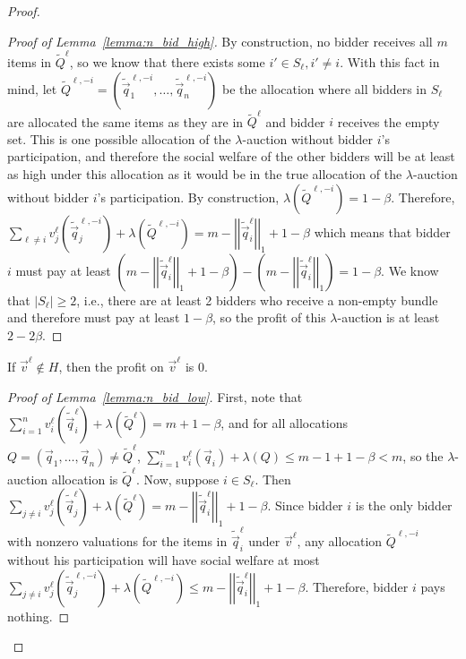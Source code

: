 \begin{proof}
\begin{proof}[Proof of Lemma~\ref{lemma:n_bid_high}]
By construction, no bidder receives all $m$ items in $\tilde{Q}^\ell$, so we know that there exists some $i' \in S_\ell, i' \not = i$. With this fact in mind, let $\tilde{Q}^{\ell,-i} = \left(\tilde{\vec{q}}^{\ell, -i}_1, \dots, \tilde{\vec{q}}^{\ell,-i}_n\right)$ be the allocation where all bidders in $S_\ell$ are allocated the same items as they are in $\tilde{Q}^\ell$ and bidder $i$ receives the empty set. This is one possible allocation of the $\lambda$-auction without bidder $i$'s participation, and therefore the social welfare of the other bidders will be at least as high under this allocation as it would be in the true allocation of the $\lambda$-auction without bidder $i$'s participation. By construction, $\lambda\left(\tilde{Q}^{\ell,-i}\right) = 1 - \beta$. Therefore, $\sum_{\ell \not= i} v_j^\ell \left(\tilde{\vec{q}}_j^{\ell,-i}\right) + \lambda\left(\tilde{Q}^{\ell,-i}\right) = m-\left|\left|\tilde{\vec{q}}_i^{\ell}\right|\right|_1 + 1 - \beta$ which means that bidder $i$ must pay at least $\left(m-\left|\left|\tilde{\vec{q}}_i^{\ell}\right|\right|_1 + 1 - \beta\right) - \left(m-\left|\left|\tilde{\vec{q}}_i^{\ell}\right|\right|_1\right) = 1 - \beta.$ We know that $|S_\ell|\geq 2$, i.e., there are at least 2 bidders who receive a non-empty bundle and therefore must pay at least $1 - \beta$, so the profit of this $\lambda$-auction is at least $2-2\beta$.
\end{proof}

\begin{lemma}\label{lemma:n_bid_low} If $\vec{v}^\ell \not\in H$, then the profit on $\vec{v}^\ell$ is 0.
\end{lemma}

\begin{proof}[Proof of Lemma~\ref{lemma:n_bid_low}]
First, note that $\sum_{i = 1}^n v_i^\ell\left(\tilde{\vec{q}}_i^{\ell}\right) + \lambda\left(\tilde{Q}^\ell\right) = m + 1-\beta$, and for all allocations $Q = \left(\vec{q}_1, \dots, \vec{q}_n\right) \not= \tilde{Q}^\ell$, $\sum_{i = 1}^n v_i^\ell\left(\vec{q}_i\right) + \lambda\left(Q\right) \leq m-1 + 1-\beta < m$, so the $\lambda$-auction allocation is $\tilde{Q}^\ell$. Now, suppose $i \in S_\ell$. Then $\sum_{j \not= i} v_j^\ell\left(\tilde{\vec{q}}_j^\ell\right) + \lambda\left(\tilde{Q}^\ell\right) = m - \left|\left|\tilde{\vec{q}}_i^{\ell}\right|\right|_1 + 1 - \beta.$ Since bidder $i$ is the only bidder with nonzero valuations for the items in $\tilde{\vec{q}}_i^{\ell}$ under $\vec{v}^\ell$, any allocation $\tilde{Q}^{\ell,-i}$ without his participation will have social welfare at most $\sum_{j \not= i} v_j^\ell\left(\tilde{\vec{q}}_j^{\ell,-i}\right) + \lambda\left(\tilde{Q}^{\ell,-i}\right) \leq m - \left|\left|\tilde{\vec{q}}_i^{\ell}\right|\right|_1 + 1 - \beta.$ Therefore, bidder $i$ pays nothing.


\end{proof}
\end{proof}
